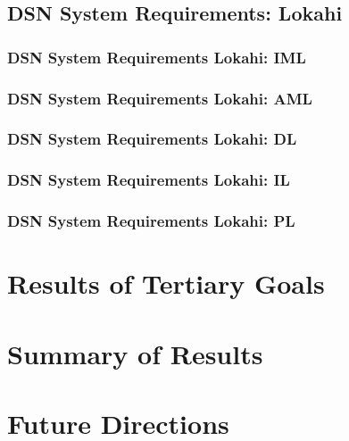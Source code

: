 \subsection{DSN System Requirements: Lokahi}\label{subsec:dsn-system-requirements:-lokahi}

\subsubsection{DSN System Requirements Lokahi: IML}

\subsubsection{DSN System Requirements Lokahi: AML}

\subsubsection{DSN System Requirements Lokahi: DL}

\subsubsection{DSN System Requirements Lokahi: IL}

\subsubsection{DSN System Requirements Lokahi: PL}

\section{Results of Tertiary Goals}\label{sec:results-of-tertiary-goals}

\section{Summary of Results}\label{sec:summary-of-results}

\section{Future Directions}\label{sec:future-directions}